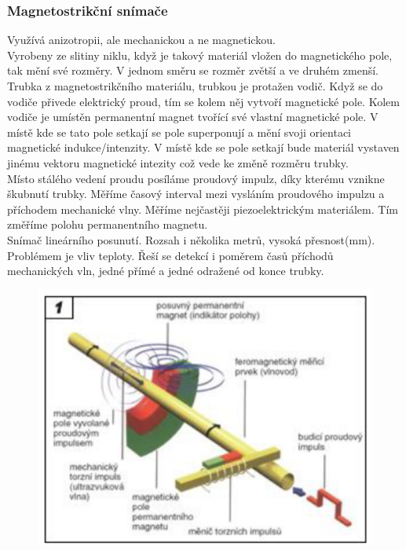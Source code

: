\subsubsection{Magnetostrikční snímače}
Využívá anizotropii, ale mechanickou a ne magnetickou.\\
Vyrobeny ze slitiny niklu, když je takový materiál vložen do magnetického pole, tak mění své rozměry. V jednom směru se rozměr zvětší a ve druhém zmenší.\\
Trubka z magnetostrikčního materiálu, trubkou je protažen vodič. Když se do vodiče přivede elektrický proud, tím se kolem něj vytvoří magnetické pole. Kolem vodiče je umístěn permanentní magnet tvořící své vlastní magnetické pole. V místě kde se tato pole setkají se pole superponují a mění svoji orientaci magnetické indukce/intenzity. V místě kde se pole setkají bude materiál vystaven jinému vektoru magnetické intezity což vede ke změně rozměru trubky.\\
Místo stálého vedení proudu posíláme proudový impulz, díky kterému vznikne škubnutí trubky. Měříme časový interval mezi vysláním proudového impulzu a příchodem mechanické vlny. Měříme nejčastěji piezoelektrickým materiálem. Tím změříme polohu permanentního magnetu.\\
Snímač lineárního posunutí. Rozsah i několika metrů, vysoká přesnost(mm).\\
Problémem je vliv teploty. Řeší se detekcí i poměrem časů příchodů mechanických vln, jedné přímé a jedné odražené od konce trubky.\\

\begin{figure}[h!]
    \centering
    \includegraphics[scale = 0.1]{img/Magnetostrik.png}
\end{figure}
